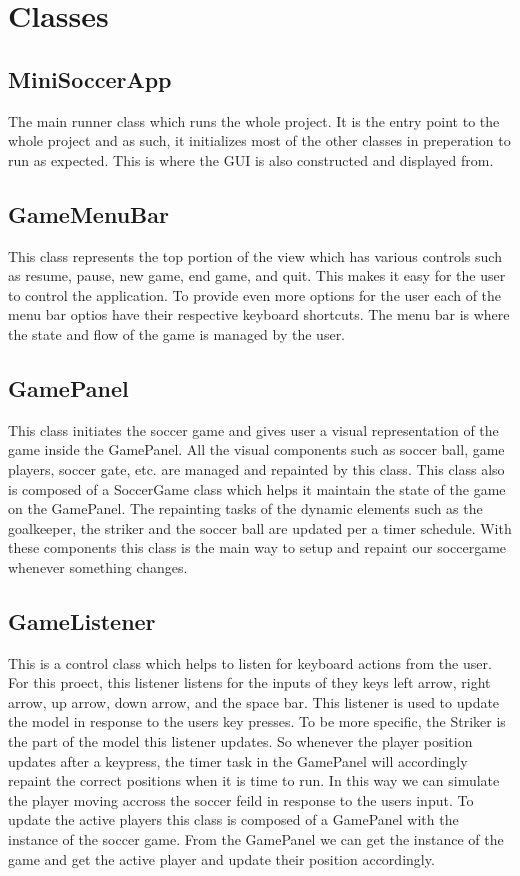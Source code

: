 \documentclass[12pt, dvipsnames, a4paper]{article}
\begin{document}
\section{Classes}
\subsection{MiniSoccerApp}
The main runner class which runs the whole project. It is the entry point to the whole project and as such,
it initializes most of the other classes in preperation to run as expected. This is where the
GUI is also constructed and displayed from.
\subsection{GameMenuBar}
This class represents the top portion of the view which has various controls such as resume, pause, new game, end game, and quit.
This makes it easy for the user to control the application. To provide even more options for the user
each of the menu bar optios have their respective keyboard shortcuts. The menu bar is where the state and flow
of the game is managed by the user.
\subsection{GamePanel}
This class initiates the soccer game and gives user a visual representation of the game inside the GamePanel. All the visual components
such as soccer ball, game players, soccer gate, etc. are managed and repainted by this class. This
class also is composed of a SoccerGame class which helps it maintain the state of the game on the GamePanel.
The repainting tasks of the dynamic elements such as the goalkeeper, the striker and the soccer ball are updated per a
timer schedule. With these components this class is the main way to setup and repaint our soccergame whenever
something changes.
\subsection{GameListener}
This is a control class which helps to listen for keyboard actions from the user. For this proect, this listener listens
for the inputs of they keys left arrow, right arrow, up arrow, down arrow, and the space bar. This listener is used
to update the model in response to the users key presses. To be more specific, the Striker is the part of the
model this listener updates. So whenever the player position updates after a keypress, the timer task
in the GamePanel will accordingly repaint the correct positions when it is time to run.
In this way we can simulate the player moving accross the soccer feild in response to the users input. To
update the active players this class is composed of a GamePanel with the instance of the soccer game.
From the GamePanel we can get the instance of the game and get the active player and update their
position accordingly.
\end{document}
